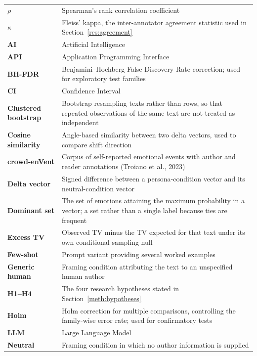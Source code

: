 \begin{longtable}{@{}p{.20\hsize} p{.75\hsize}@{}}
\textbf{$\rho$} & Spearman's rank correlation coefficient \\[6pt]
\textbf{$\kappa$} & Fleiss' kappa, the inter-annotator agreement statistic used in Section~\ref{res:agreement} \\[6pt]
\textbf{AI} & Artificial Intelligence \\[6pt]
\textbf{API} & Application Programming Interface \\[6pt]
\textbf{BH-FDR} & Benjamini--Hochberg False Discovery Rate correction; used for exploratory test families \\[6pt]
\textbf{CI} & Confidence Interval \\[6pt]
\textbf{Clustered bootstrap} & Bootstrap resampling texts rather than rows, so that repeated observations of the same text are not treated as independent \\[6pt]
\textbf{Cosine similarity} & Angle-based similarity between two delta vectors, used to compare shift direction \\[6pt]
\textbf{crowd-enVent} & Corpus of self-reported emotional events with author and reader annotations (Troiano et al., 2023) \\[6pt]
\textbf{Delta vector} & Signed difference between a persona-condition vector and its neutral-condition vector \\[6pt]
\textbf{Dominant set} & The set of emotions attaining the maximum probability in a vector; a set rather than a single label because ties are frequent \\[6pt]
\textbf{Excess TV} & Observed TV minus the TV expected for that text under its own conditional sampling null \\[6pt]
\textbf{Few-shot} & Prompt variant providing several worked examples \\[6pt]
\textbf{Generic human} & Framing condition attributing the text to an unspecified human author \\[6pt]
\textbf{H1--H4} & The four research hypotheses stated in Section~\ref{meth:hypotheses} \\[6pt]
\textbf{Holm} & Holm correction for multiple comparisons, controlling the family-wise error rate; used for confirmatory tests \\[6pt]
\textbf{LLM} & Large Language Model \\[6pt]
\textbf{Neutral} & Framing condition in which no author information is supplied \\[6pt]

\end{longtable}
